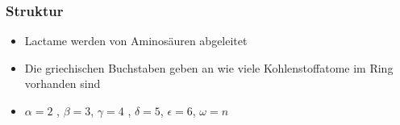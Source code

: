 \documentclass[10pt]{beamer}
\begin{document}
\begin{frame}[t]
\frametitle{Struktur}
  \begin{itemize}
    \item Lactame werden von Aminosäuren abgeleitet
  \end{itemize}
  \begin{center}
\end{center}
  \begin{center}
\end{center}
  \begin{itemize}
    \item \small Die griechischen Buchstaben geben an wie viele Kohlenstoffatome im Ring vorhanden sind
    \item $\alpha =2$ , $\beta = 3$, $\gamma =4$ , $\delta = 5$, $\epsilon = 6$, $\omega=n$
  \end{itemize}

\end{frame}
\end{document}
